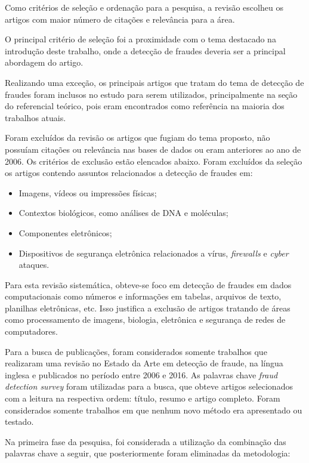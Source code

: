 \documentclass[smallextended]{svjour3}
\begin{document}
Como critérios de seleção e ordenação para a pesquisa, a revisão escolheu os artigos com maior número de citações e relevância para a área. 

O principal critério de seleção foi a proximidade com o tema destacado na introdução deste trabalho, onde a detecção de fraudes deveria ser a principal abordagem do artigo.

Realizando uma exceção, os principais artigos que tratam do tema de detecção de fraudes foram inclusos no estudo para serem utilizados, principalmente na seção do referencial teórico, pois eram encontrados como referência na maioria dos trabalhos atuais.

Foram excluídos da revisão os artigos que fugiam do tema proposto, não possuíam citações ou relevância nas bases de dados ou eram anteriores ao ano de 2006. Os critérios de exclusão estão elencados abaixo. Foram excluídos da seleção os artigos contendo assuntos relacionados a detecção de fraudes em:

\begin{itemize}
	\item Imagens, vídeos ou impressões físicas;
	
	\item Contextos biológicos, como análises de DNA e moléculas;
	
	\item Componentes eletrônicos; 	
	
	\item Dispositivos de segurança eletrônica relacionados a vírus, \emph{firewalls} e \emph{cyber} ataques.
\end{itemize}

Para esta revisão sistemática, obteve-se foco em detecção de fraudes em dados computacionais como números e informações em tabelas, arquivos de texto, planilhas eletrônicas, etc. Isso justifica a exclusão de artigos tratando de áreas como processamento de imagens, biologia, eletrônica e segurança de redes de computadores.

Para a busca de publicações, foram considerados somente trabalhos que realizaram uma revisão no Estado da Arte em detecção de fraude, na língua inglesa e publicados no período entre 2006 e 2016. As palavras chave \emph{fraud detection survey} foram utilizadas para a busca, que obteve artigos selecionados com a leitura na respectiva ordem: título, resumo e artigo completo. Foram considerados somente trabalhos em que nenhum novo método era apresentado ou testado.

Na primeira fase da pesquisa, foi considerada a utilização da combinação das palavras chave a seguir, que posteriormente foram eliminadas da metodologia:
\end{document}
